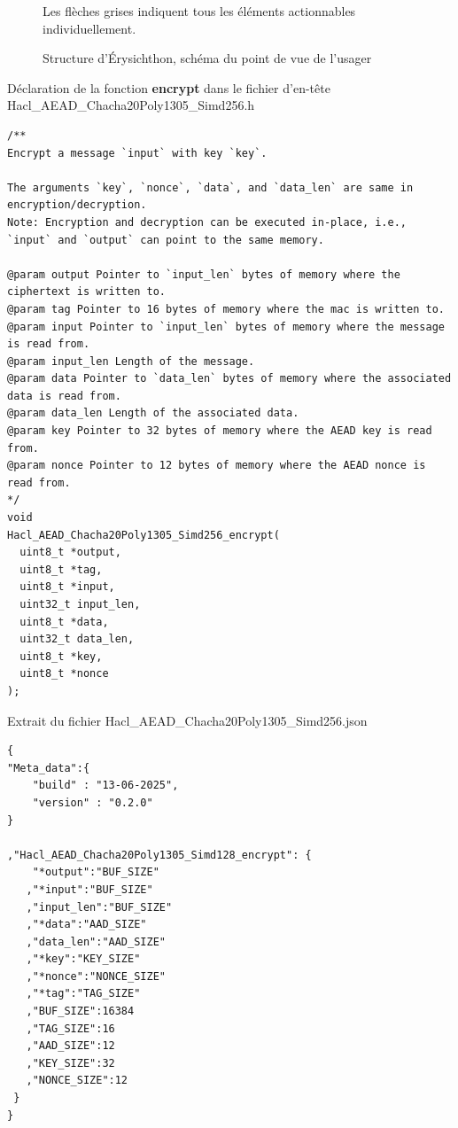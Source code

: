 \begin{figure}[!ht]
  \caption{Structure d'Érysichthon, schéma du point de vue de l'usager}
  \label{fig:erysichthon_structure}
  \small
  Les flèches grises indiquent tous les éléments actionnables individuellement.
\end{figure}

\newpage
\begin{listing}[!ht]
  \caption{Déclaration de la fonction \textbf{encrypt} dans le fichier d'en-tête Hacl\_AEAD\_\-Chacha20\-Poly1305\_Simd256.h}
  \label{lst:exemple_header}
  \begin{verbatim}
/**
Encrypt a message `input` with key `key`.

The arguments `key`, `nonce`, `data`, and `data_len` are same in encryption/decryption.
Note: Encryption and decryption can be executed in-place, i.e.,
`input` and `output` can point to the same memory.

@param output Pointer to `input_len` bytes of memory where the ciphertext is written to.
@param tag Pointer to 16 bytes of memory where the mac is written to.
@param input Pointer to `input_len` bytes of memory where the message is read from.
@param input_len Length of the message.
@param data Pointer to `data_len` bytes of memory where the associated data is read from.
@param data_len Length of the associated data.
@param key Pointer to 32 bytes of memory where the AEAD key is read from.
@param nonce Pointer to 12 bytes of memory where the AEAD nonce is read from.
*/
void
Hacl_AEAD_Chacha20Poly1305_Simd256_encrypt(
  uint8_t *output,
  uint8_t *tag,
  uint8_t *input,
  uint32_t input_len,
  uint8_t *data,
  uint32_t data_len,
  uint8_t *key,
  uint8_t *nonce
);
  \end{verbatim}
\end{listing}

\vfill
\begin{listing}[!htb]
  \caption{Extrait du fichier Hacl\_AEAD\_Chacha20Poly1305\_Simd256.json}
  \label{lst:exemple_json}
  \begin{verbatim}
{
"Meta_data":{
    "build" : "13-06-2025",
    "version" : "0.2.0"
}

,"Hacl_AEAD_Chacha20Poly1305_Simd128_encrypt": {
    "*output":"BUF_SIZE"
   ,"*input":"BUF_SIZE"
   ,"input_len":"BUF_SIZE"
   ,"*data":"AAD_SIZE"
   ,"data_len":"AAD_SIZE"
   ,"*key":"KEY_SIZE"
   ,"*nonce":"NONCE_SIZE"
   ,"*tag":"TAG_SIZE"
   ,"BUF_SIZE":16384
   ,"TAG_SIZE":16
   ,"AAD_SIZE":12
   ,"KEY_SIZE":32
   ,"NONCE_SIZE":12
 }
}
  \end{verbatim}
\end{listing}

